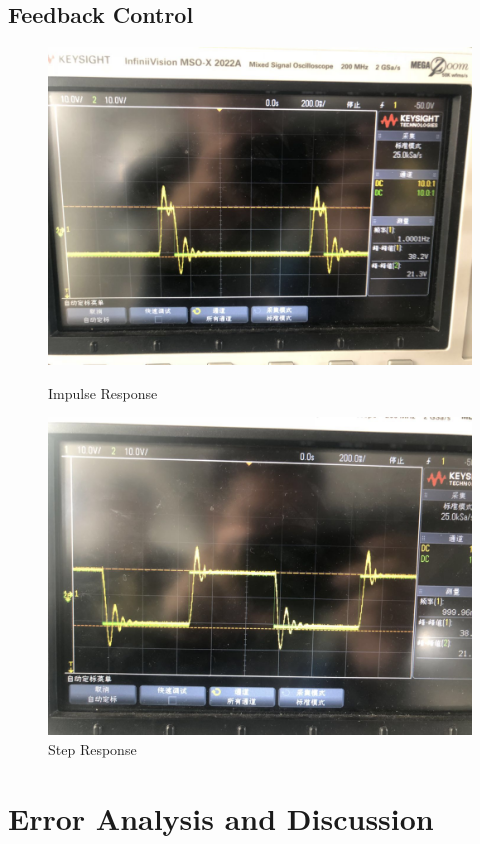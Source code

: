 \documentclass[12pt]{article}
\begin{document}
\subsection{Feedback Control}
\begin{figure}[H]
\centering
\includegraphics[scale=0.22]{P10.jpg}
\caption{Impulse Response}
\includegraphics[scale=0.22]{P11.jpg}
\caption{Step Response}
\end{figure}
\section{Error Analysis and Discussion}
\end{document}
